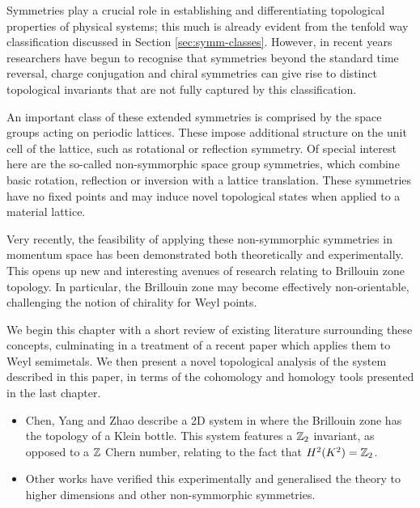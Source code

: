 
Symmetries play a crucial role in establishing and differentiating topological properties of physical systems; this much is already evident from the tenfold way classification discussed in Section \ref{sec:symm-classes}. However, in recent years researchers have begun to recognise that symmetries beyond the standard time reversal, charge conjugation and chiral symmetries can give rise to distinct topological invariants that are not fully captured by this classification.

An important class of these extended symmetries is comprised by the space groups acting on periodic lattices. These impose additional structure on the unit cell of the lattice, such as rotational or reflection symmetry. Of special interest here are the so-called non-symmorphic space group symmetries, which combine basic rotation, reflection or inversion with a lattice translation. These symmetries have no fixed points and may induce novel topological states when applied to a material lattice.

Very recently, the feasibility of applying these non-symmorphic symmetries in momentum space has been demonstrated both theoretically and experimentally. This opens up new and interesting avenues of research relating to Brillouin zone topology. In particular, the Brillouin zone may become effectively non-orientable, challenging the notion of chirality for Weyl points.

We begin this chapter with a short review of existing literature surrounding these concepts, culminating in a treatment of a recent paper which applies them to Weyl semimetals. We then present a novel topological analysis of the system described in this paper, in terms of the cohomology and homology tools presented in the last chapter.


{\color{blue}
\begin{itemize}
	\item Chen, Yang and Zhao describe a 2D system in \cite{CYZ_Klein-gauge} where the Brillouin zone has the topology of a Klein bottle. This system features a $\mathbb{Z}_2$ invariant, as opposed to a $\mathbb{Z}$ Chern number, relating to the fact that $H^2(K^2) = \mathbb{Z}_2$.
	
	\item Other works have verified this experimentally and generalised the theory to higher dimensions and other non-symmorphic symmetries.
\end{itemize}
}

